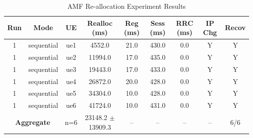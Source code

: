\begin{table}[ht]
\centering
\begin{tabular}{|c|c|c|c|c|c|c|c|c|}
\hline
Run & Mode & UE & Realloc (ms) & Reg (ms) & Sess (ms) & RRC (ms) & IP Chg & Recov \\
\hline
1 & sequential & ue1 & 4552.0 & 21.0 & 430.0 & 0.0 & Y & Y \\
1 & sequential & ue2 & 11994.0 & 17.0 & 435.0 & 0.0 & Y & Y \\
1 & sequential & ue3 & 19443.0 & 17.0 & 433.0 & 0.0 & Y & Y \\
1 & sequential & ue4 & 26872.0 & 20.0 & 428.0 & 0.0 & Y & Y \\
1 & sequential & ue5 & 34304.0 & 10.0 & 428.0 & 0.0 & Y & Y \\
1 & sequential & ue6 & 41724.0 & 10.0 & 431.0 & 0.0 & Y & Y \\
\multicolumn{2}{|c|}{\textbf{Aggregate}} & n=6 & 23148.2 $\pm$ 13909.3 & -- & -- & -- & -- & 6/6 \\
\hline
\end{tabular}
\caption{AMF Re-allocation Experiment Results}
\label{tab:amf_realloc}
\end{table}
